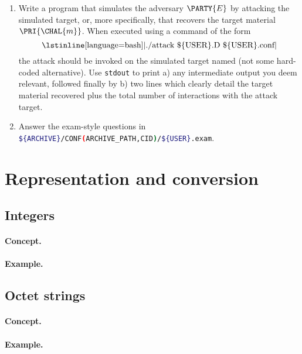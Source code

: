 \documentclass[crop={false},multi={true},tikz={true}]{standalone}
\begin{document}

\begin{enumerate}
\item Write a program that simulates the adversary $\PARTY{E}$ by attacking
      the simulated target, or, more specifically, that recovers the target 
      material $\PRI{\CHAL{m}}$.  
      When executed using a command of the form
      \[
      \mbox{\lstinline[language={bash}]|./attack \$\{USER\}.D \$\{USER\}.conf|}
      \]
      the attack should be invoked on the simulated target named (not some
      hard-coded alternative).  Use \lstinline[language={bash}]{stdout} to 
      print 
      a) any intermediate output you deem relevant, followed finally by 
      b) two lines which clearly detail the target material recovered plus
         the total number of interactions with the attack target.
\item Answer the exam-style questions in 
      \lstinline[language={bash}]|${ARCHIVE}/CONF(ARCHIVE_PATH,CID)/${USER}.exam|.
\end{enumerate}


\ifstandalone
\printbibliography
\fi


\ifstandalone
\appendix 
\section{Representation and conversion}

\subsection{Integers}

\paragraph{Concept.}

\paragraph{Example.}


\subsection{Octet strings}

\paragraph{Concept.}

\paragraph{Example.}

\fi

\end{document}
